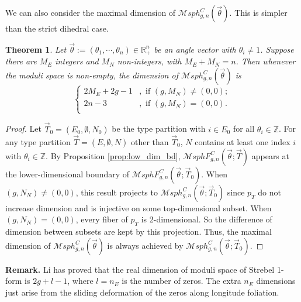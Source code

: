 \documentclass[pdflatex,sn-mathphys]{sn-jnl}%
\numberwithin{equation}{section}
\theoremstyle{thmstyleone}%
\newtheorem{theorem}{Theorem}[section]%
\newcommand{\RR}{\mathbb{R}}
\newcommand{\ZZ}{\mathbb{Z}}
\newcommand{\MsphC}[3]{\mathcal{M}sph^C_{#1,#2}(#3)}
\newcommand{\MsphCF}[3]{\mathcal{M}sphF_{#1,#2}^C(#3)}
\newcommand{\MsphgnC}{\mathcal{M}sph^C_{g,n}(\vec{\theta})}
\newcommand{\MsphgnCT}{\mathcal{M}sph_{g,n}^C(\vec{\theta};\vec{T})}
\begin{document}
We can also consider the maximal dimension of $\MsphgnC$. This is simpler than the strict dihedral case.
\begin{theorem}\label{thm:dim_count_C}
    Let $\vec{\theta}:=(\theta_1, \cdots, \theta_n) \in \RR^n_+$ be an angle vector with $\theta_i\neq1$. Suppose there are $M_E$ integers and $M_N$ non-integers, with $M_E + M_N = n$. Then whenever the moduli space is non-empty, the dimension of $\MsphgnC$ is
    \[\left\{   \begin{array}{ll}
        2M_E+2g-1 & , \text{ if } (g, M_N)\neq(0,0) ; \\
        2n-3 & , \text{ if } (g, M_N)=(0,0) .\\
                \end{array}
    \right. \]
\end{theorem}
\begin{proof}

    Let $\vec{T}_0=(E_0,\emptyset,N_0)$ be the type partition with $i\in E_0$ for all $\theta_i\in\ZZ$. For any type partition $\vec{T}=(E,\emptyset,N)$ other than $\vec{T}_0$, $N$ contains at least one index $i$ with $\theta_i\in\ZZ$. By Proposition \ref{prop:low_dim_bd}, $\MsphCF{g}{n}{\vec{\theta};\vec{T}}$ appears at the lower-dimensional boundary of $\MsphCF{g}{n}{\vec{\theta};\vec{T}_0}$.
    When $(g,N_N)\neq(0,0)$, this result projects to $\MsphC{g}{n}{\vec{\theta};\vec{T}_0}$ since $p_T$ do not increase dimension and is injective on some top-dimensional subset.
    When $(g,N_N)=(0,0)$, every fiber of $p_T$ is 2-dimensional. So the difference of dimension between subsets are kept by this projection.
    Thus, the maximal dimension of $\MsphgnC$ is always achieved by $\MsphC{g}{n}{\vec{\theta};\vec{T}_0}$.
\end{proof}

\textbf{Remark.} Li \cite{Li19} has proved that the real dimension of moduli space of Strebel 1-form is $2g+l-1$, where $l=n_E$ is the number of zeros. The extra $n_E$ dimensions just arise from the sliding deformation of the zeros along longitude foliation.
\end{document}
